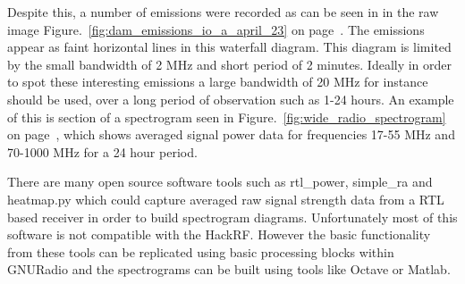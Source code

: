 Despite this, a number of emissions were recorded as can be seen in in the raw image Figure.~\ref{fig:dam_emissions_io_a_april_23} on page~\pageref{fig:dam_emissions_io_a_april_23}. The emissions appear as faint horizontal lines in this waterfall diagram. This diagram is limited by the small bandwidth of 2 MHz and short period of 2 minutes. Ideally in order to spot these interesting emissions a large bandwidth of 20 MHz for instance should be used, over a long period of observation such as 1-24 hours. An example of this is section of a spectrogram seen in Figure.~\ref{fig:wide_radio_spectrogram} on page~\pageref{fig:wide_radio_spectrogram}, which shows averaged signal power data for frequencies 17-55 MHz and 70-1000 MHz for a 24 hour period.


There are many open source software tools such as rtl\_power, simple\_ra and heatmap.py which could capture averaged raw signal strength data from a RTL based receiver in order to build spectrogram diagrams. Unfortunately most of this software is not compatible with the HackRF. However the basic functionality from these tools can be replicated using basic processing blocks within GNURadio and the spectrograms can be built using tools like Octave or Matlab.

